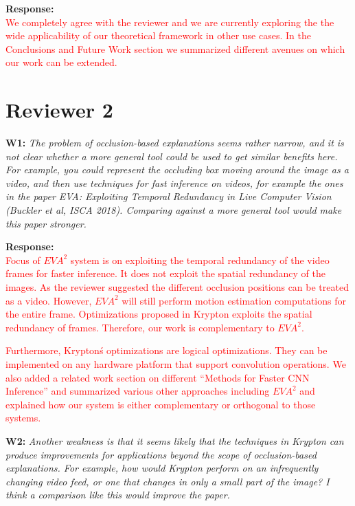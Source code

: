 \documentclass[preprint]{vldb}
\newcommand{\red}{\textcolor{red}}
\begin{document}
\vspace{2mm}
\noindent \textbf{Response:} \\
\red{We completely agree with the reviewer and we are currently exploring the the wide applicability of our theoretical framework in other use cases. In the Conclusions and Future Work section we summarized different avenues on which our work can be extended.}


\section{Reviewer 2}

\vspace{2mm}
\noindent \textbf{W1:} \textit{The problem of occlusion-based explanations seems rather narrow, and it is not clear whether a more general tool could be used to get similar benefits here. For example, you could represent the occluding box moving around the image as a video, and then use techniques for fast inference on videos, for example the ones in the paper EVA: Exploiting Temporal Redundancy in Live Computer Vision (Buckler et al, ISCA 2018). Comparing against a more general tool would make this paper stronger.}

\vspace{2mm}
\noindent \textbf{Response:}\\
\red{Focus of $EVA^2$ system is on exploiting the temporal redundancy of the video frames for faster inference. It does not exploit the spatial redundancy of the images. As the reviewer suggested the different occlusion positions can be treated as a video. However, $EVA^2$ will still perform motion estimation computations for the entire frame. Optimizations proposed in Krypton exploits the spatial redundancy of frames. Therefore, our work is complementary to $EVA^2$.}

\red{
Furthermore, Krypton\'s optimizations are logical optimizations. They can be implemented on any hardware platform that support convolution operations.
We also added a related work section on different ``Methods for Faster CNN Inference'' and summarized various other approaches including $EVA^2$ and explained how our system is either complementary or orthogonal to those systems.
}


\vspace{2mm}
\noindent \textbf{W2:} \textit{Another weakness is that it seems likely that the techniques in Krypton can produce improvements for applications beyond the scope of occlusion-based explanations. For example, how would Krypton perform on an infrequently changing video feed, or one that changes in only a small part of the image? I think a comparison like this would improve the paper.}
\end{document}
